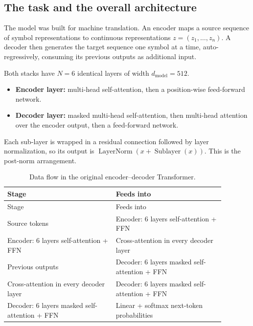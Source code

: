 \subsection{The task and the overall
architecture}\label{sec:math:II1}

The model was built for machine translation. An encoder maps a source
sequence of symbol representations to continuous representations \(z =
(z_{1}, \ldots, z_{n})\). A decoder then generates the target
sequence one symbol at a time, auto-regressively, consuming its previous
outputs as additional input.

Both stacks have \(N = 6\) identical layers of width \(d_{\text{model}} = 512\).

\begin{itemize}
\tightlist
\item
  \textbf{Encoder layer:} multi-head self-attention, then a
  position-wise feed-forward network.
\item
  \textbf{Decoder layer:} masked multi-head self-attention, then
  multi-head attention over the encoder output, then a feed-forward
  network.
\end{itemize}

Each sub-layer is wrapped in a residual connection followed by layer
normalization, so its output is \(\operatorname{LayerNorm}(x + \operatorname{Sublayer}(x))\). This is the
post-norm arrangement.

\begin{longtable}{@{}>{\raggedright\arraybackslash}p{0.44\linewidth}>{\raggedright\arraybackslash}p{0.44\linewidth}@{}}
\caption{Data flow in the original encoder--decoder Transformer.}\\
\toprule
Stage & Feeds into \\
\midrule
\endfirsthead
\toprule
Stage & Feeds into \\
\midrule
\endhead
\bottomrule
\endlastfoot
Source tokens & Encoder: 6 layers self-attention + FFN \\
Encoder: 6 layers self-attention + FFN & Cross-attention in every decoder layer \\
Previous outputs & Decoder: 6 layers masked self-attention + FFN \\
Cross-attention in every decoder layer & Decoder: 6 layers masked self-attention + FFN \\
Decoder: 6 layers masked self-attention + FFN & Linear + softmax next-token probabilities \\
\end{longtable}

